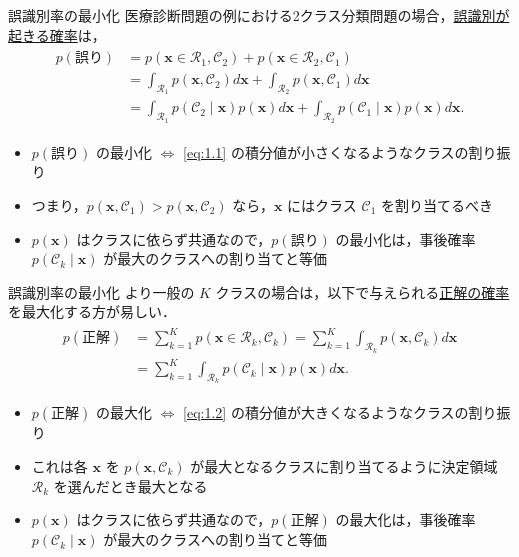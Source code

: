 \documentclass[uplatex,11pt,dvipdfmx,aspectratio=169,unicode,t]{beamer}
\numberwithin{equation}{section}
\newcommand{\CC}{\mathcal{C}}
\newcommand{\CR}{\mathcal{R}}
\newcommand{\bs}[1]{\boldsymbol{#1}}
\newcommand{\1}{\bs{1}}
\newcommand{\0}{\bs{0}}
\begin{document}
\begin{frame}{誤識別率の最小化}
    医療診断問題の例における2クラス分類問題の場合，\underline{誤識別が起きる確率}は，
    \begin{align} \label{eq:1.1}
        \begin{aligned}
            p(\text{誤り}) &= p(\bs{x} \in \CR_{1},\CC_{2}) + p(\bs{x} \in \CR_{2},\CC_{1}) \\
            &= \int_{\CR_{1}} p(\bs{x},\CC_{2}) d{\bs{x}} + \int_{\CR_{2}} p(\bs{x},\CC_{1}) d{\bs{x}} \\
            &= \int_{\CR_{1}} p(\CC_{2} \mid \bs{x}) p(\bs{x}) d{\bs{x}} + \int_{\CR_{2}} p(\CC_{1} \mid \bs{x}) p(\bs{x}) d{\bs{x}}.
        \end{aligned}
    \end{align}
    \begin{itemize}
        \item $p(\text{誤り})$ の最小化 $\iff$ \eqref{eq:1.1} の積分値が小さくなるようなクラスの割り振り
        \item つまり，$p(\bs{x},\CC_{1}) > p(\bs{x},\CC_{2})$ なら，$\bs{x}$ にはクラス $\CC_{1}$ を割り当てるべき
        \item $p(\bs{x})$ はクラスに依らず共通なので，$p(\text{誤り})$ の最小化は，事後確率 $p(\CC_{k} \mid \bs{x})$ が最大のクラスへの割り当てと等価
    \end{itemize}
\end{frame}

\begin{frame}{誤識別率の最小化}
    より一般の $K$ クラスの場合は，以下で与えられる\underline{正解の確率}を最大化する方が易しい．
    \begin{align} \label{eq:1.2}
        \begin{aligned}
            p(\text{正解}) &= \sum_{k=1}^{K} p(\bs{x} \in \CR_{k},\CC_{k}) = \sum_{k=1}^{K} \int_{\CR_{k}} p(\bs{x},\CC_{k}) d{\bs{x}} \\
            &= \sum_{k=1}^{K} \int_{\CR_{k}} p(\CC_{k} \mid \bs{x}) p(\bs{x}) d{\bs{x}}.
        \end{aligned}
    \end{align}
    \begin{itemize}
        \item $p(\text{正解})$ の最大化 $\iff$ \eqref{eq:1.2} の積分値が大きくなるようなクラスの割り振り
        \item これは各 $\bs{x}$ を $p(\bs{x},\CC_{k})$ が最大となるクラスに割り当てるように決定領域 $\CR_{k}$ を選んだとき最大となる
        \item $p(\bs{x})$ はクラスに依らず共通なので，$p(\text{正解})$ の最大化は，事後確率 $p(\CC_{k} \mid \bs{x})$ が最大のクラスへの割り当てと等価
    \end{itemize}
\end{frame}
\end{document}
